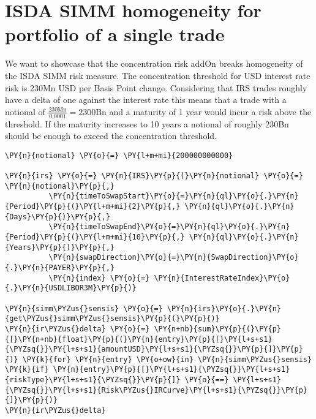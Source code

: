     

    
    \hypertarget{isda-simm-homogeneity-for-portfolio-of-a-single-trade}{%
\section{ISDA SIMM homogeneity for portfolio of a single
trade}\label{isda-simm-homogeneity-for-portfolio-of-a-single-trade}}

    We want to showcase that the concentration risk addOn breaks homogeneity
of the ISDA SIMM risk measure. The concentration threshold for USD
interest rate risk is 230Mn USD per Basis Point change. Considering that
IRS trades roughly have a delta of one against the interest rate this
means that a trade with a notional of
\(\frac{230\text{Mn}}{0.0001} = 2300\text{Bn}\) and a maturity of 1 year
would incur a risk above the threshold. If the maturity increases to 10
years a notional of roughly 230Bn should be enough to exceed the
concentration threshold.

    \begin{tcolorbox}[breakable, size=fbox, boxrule=1pt, pad at break*=1mm,colback=cellbackground, colframe=cellborder]
\begin{Verbatim}[commandchars=\\\{\}]
\PY{n}{notional} \PY{o}{=} \PY{l+m+mi}{200000000000}

\PY{n}{irs} \PY{o}{=} \PY{n}{IRS}\PY{p}{(}\PY{n}{notional} \PY{o}{=} \PY{n}{notional}\PY{p}{,}
          \PY{n}{timeToSwapStart}\PY{o}{=}\PY{n}{ql}\PY{o}{.}\PY{n}{Period}\PY{p}{(}\PY{l+m+mi}{2}\PY{p}{,} \PY{n}{ql}\PY{o}{.}\PY{n}{Days}\PY{p}{)}\PY{p}{,}
          \PY{n}{timeToSwapEnd}\PY{o}{=}\PY{n}{ql}\PY{o}{.}\PY{n}{Period}\PY{p}{(}\PY{l+m+mi}{10}\PY{p}{,} \PY{n}{ql}\PY{o}{.}\PY{n}{Years}\PY{p}{)}\PY{p}{,}
          \PY{n}{swapDirection}\PY{o}{=}\PY{n}{SwapDirection}\PY{o}{.}\PY{n}{PAYER}\PY{p}{,}
          \PY{n}{index} \PY{o}{=} \PY{n}{InterestRateIndex}\PY{o}{.}\PY{n}{USDLIBOR3M}\PY{p}{)}

\PY{n}{simm\PYZus{}sensis} \PY{o}{=} \PY{n}{irs}\PY{o}{.}\PY{n}{get\PYZus{}simm\PYZus{}sensis}\PY{p}{(}\PY{p}{)}
\PY{n}{ir\PYZus{}delta} \PY{o}{=} \PY{n+nb}{sum}\PY{p}{(}\PY{p}{[}\PY{n+nb}{float}\PY{p}{(}\PY{n}{entry}\PY{p}{[}\PY{l+s+s1}{\PYZsq{}}\PY{l+s+s1}{amountUSD}\PY{l+s+s1}{\PYZsq{}}\PY{p}{]}\PY{p}{)} \PY{k}{for} \PY{n}{entry} \PY{o+ow}{in} \PY{n}{simm\PYZus{}sensis} \PY{k}{if} \PY{n}{entry}\PY{p}{[}\PY{l+s+s1}{\PYZsq{}}\PY{l+s+s1}{riskType}\PY{l+s+s1}{\PYZsq{}}\PY{p}{]} \PY{o}{==} \PY{l+s+s1}{\PYZsq{}}\PY{l+s+s1}{Risk\PYZus{}IRCurve}\PY{l+s+s1}{\PYZsq{}}\PY{p}{]}\PY{p}{)}
\PY{n}{ir\PYZus{}delta}
\end{Verbatim}
\end{tcolorbox}

